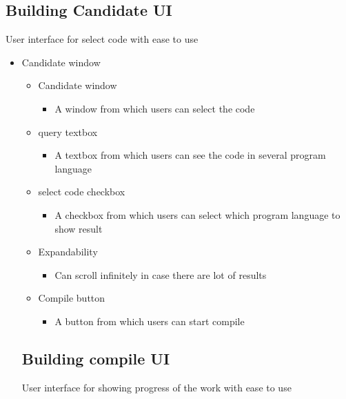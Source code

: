 \documentclass[conference]{IEEEtran}
\begin{document}
\begin{itemize}
\subsection{Building Candidate UI}
 User interface for select code with ease to use

\begin{itemize}
  \item Candidate window
  \begin{itemize}
\begin{itemize}
  \item Candidate window
  \begin{itemize}
    \item A window from which users can select the code 
  \end{itemize}
  \item query textbox
  \begin{itemize}
    \item A textbox from which users can see the code in several program language
  \end{itemize}
  \item select code checkbox
  \begin{itemize}
    \item A checkbox from which users can select which program language to show result
  \end{itemize}
  \item Expandability 
  \begin{itemize}
    \item Can scroll infinitely in case there are lot of results
  \end{itemize}
  \item Compile button 
  \begin{itemize}
    \item A button from which users can start compile
  \end{itemize}
\end{itemize}
\textit{ }


\subsection{Building compile UI}
 User interface for showing progress of the work with ease to use


\end{itemize}
\end{itemize}
\end{itemize}
\end{document}

